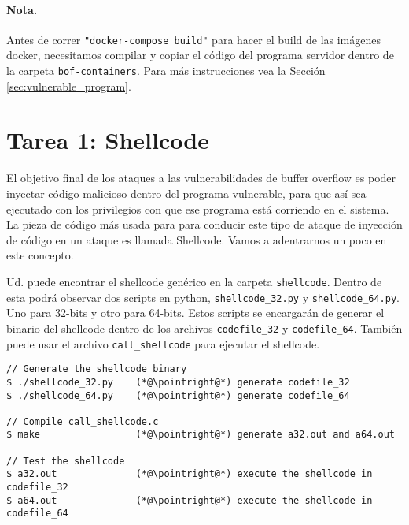 


\paragraph{Nota.} Antes de correr \texttt{"docker-compose build"} para hacer el build de las imágenes docker, necesitamos compilar y copiar el código del programa servidor dentro de la carpeta \texttt{bof-containers}. Para más instrucciones vea la Sección  \ref{sec:vulnerable_program}.



\section{Tarea 1: Shellcode}
El objetivo final de los ataques a las vulnerabilidades de buffer overflow es poder inyectar código malicioso dentro del programa vulnerable, para que así sea ejecutado con los privilegios con que ese programa está corriendo en el sistema.
La pieza de código más usada para para conducir este tipo de ataque de inyección de código en un ataque es llamada Shellcode.
Vamos a adentrarnos un poco en este concepto.



Ud. puede encontrar el shellcode genérico en la carpeta \texttt{shellcode}.
Dentro de esta podrá observar dos scripts en python, \texttt{shellcode\_32.py} y \texttt{shellcode\_64.py}. 
Uno para 32-bits y otro para 64-bits.
Estos scripts se encargarán de generar el binario del shellcode dentro de los archivos \texttt{codefile\_32} y \texttt{codefile\_64}.
También puede usar el archivo \texttt{call\_shellcode} para ejecutar el shellcode. 


\newcommand{\pointright}{\ding{221}}

\begin{lstlisting}
// Generate the shellcode binary 
$ ./shellcode_32.py    (*@\pointright@*) generate codefile_32
$ ./shellcode_64.py    (*@\pointright@*) generate codefile_64

// Compile call_shellcode.c
$ make                 (*@\pointright@*) generate a32.out and a64.out 

// Test the shellcode 
$ a32.out              (*@\pointright@*) execute the shellcode in codefile_32
$ a64.out              (*@\pointright@*) execute the shellcode in codefile_64
\end{lstlisting}
 

